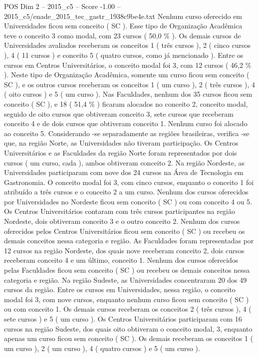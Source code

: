 \begin{textsample}{POS Dim 2 – 2015\_c5 – Score -1.00 – 2015\_c5/enade\_2015\_tec\_gastr\_1938c9be4e.txt}
Nenhum curso oferecido em Universidades ficou sem conceito ( SC ).
Esse tipo de Organização Acadêmica teve o conceito 3 como modal, com 23 cursos ( 50,0 \% ).
Os demais cursos de Universidades avaliados receberam os conceitos 1 ( três cursos ), 2 ( cinco cursos ), 4 ( 11 cursos ) e conceito 5 ( quatro cursos, como já mencionado ).
Entre os cursos em Centros Universitários, o conceito modal foi 3, com 12 cursos ( 46,2 \% ).
Neste tipo de Organização Acadêmica, somente um curso ficou sem conceito ( SC ), e os outros cursos receberam os conceitos 1 ( um curso ), 2 ( três cursos ), 4 ( oito cursos ) e 5 ( um curso ).
Nas Faculdades, nenhum dos 35 cursos ficou sem conceito ( SC ), e 18 ( 51,4 \% ) ficaram alocados no conceito 2, conceito modal, seguido de oito cursos que obtiveram conceito 3, sete cursos que receberam conceito 4 e de dois cursos que obtiveram conceito 1.
Nenhum curso foi alocado ao conceito 5.
Considerando -se separadamente as regiões brasileiras, verifica -se que, na região Norte, as Universidades não tiveram participação.
Os Centros Universitários e as Faculdades da região Norte foram representados por dois cursos ( um curso, cada ), ambos obtiveram conceito 2.
Na região Nordeste, as Universidades participaram com nove dos 24 cursos na Área de Tecnologia em Gastronomia.
O conceito modal foi 3, com cinco cursos, enquanto o conceito 1 foi atribuído a três cursos e o conceito 2 a um curso.
Nenhum dos cursos oferecidos por Universidades no Nordeste ficou sem conceito ( SC ) ou com conceito 4 ou 5.
Os Centros Universitários contaram com três cursos participantes na região Nordeste, dois obtiveram conceito 3 e o outro conceito 2.
Nenhum dos cursos oferecidos pelos Centros Universitários ficou sem conceito ( SC ) ou recebeu os demais conceitos nessa categoria e região.
As Faculdades foram representadas por 12 cursos na região Nordeste, dos quais nove receberam conceito 2, dois cursos receberam conceito 4 e um último, conceito 1.
Nenhum dos cursos oferecidos pelas Faculdades ficou sem conceito ( SC ) ou recebeu os demais conceitos nessa categoria e região.
Na região Sudeste, as Universidades concentraram 20 dos 49 cursos da região.
Entre os cursos em Universidades, nessa região, o conceito modal foi 3, com nove cursos, enquanto nenhum curso ficou sem conceito ( SC ) ou com conceito 1.
Os demais cursos receberam os conceitos 2 ( três cursos ), 4 ( sete cursos ) e 5 ( um curso ).
Os Centros Universitários participaram com 16 cursos na região Sudeste, dos quais oito obtiveram o conceito modal, 3, enquanto apenas um curso ficou sem conceito ( SC ).
Os demais receberam os conceitos 1 ( um curso ), 2 ( um curso ), 4 ( quatro cursos ) e 5 ( um curso ).

\end{textsample}
